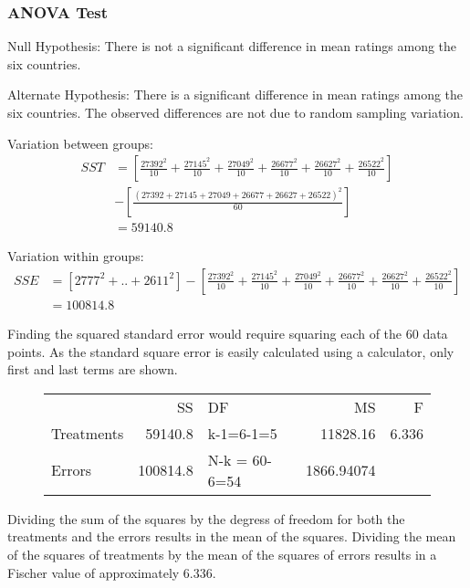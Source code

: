 \documentclass[12pt, titlepage]{article}
\begin{document}
\subsubsection{ANOVA Test}
Null Hypothesis: There is not a significant difference in mean ratings among the six countries. 

Alternate Hypothesis: There is a significant difference in mean ratings among the six countries. The observed differences are not due to random sampling variation.

Variation between groups:
\begin{equation*}
\begin{split}
    SST & = [\frac{27392^{2}}{10} + \frac{27145^{2}}{10} + \frac{27049^{2}}{10} + \frac{26677^{2}}{10} + \frac{26627^{2}}{10} + \frac{26522^{2}}{10}] \\ 
    & - [\frac{(27392+27145+27049+26677+26627+26522)^{2}}{60}] \\
    & = 59140.8 
\end{split}
\end{equation*}

Variation within groups:
\begin{equation*}
\begin{split}
    SSE & = [2777^{2} + .. + 2611^{2}] - [\frac{27392^{2}}{10} + \frac{27145^{2}}{10} + \frac{27049^{2}}{10} + \frac{26677^{2}}{10} + \frac{26627^{2}}{10} + \frac{26522^{2}}{10}] \\
    & = 100814.8 
\end{split}
\end{equation*}

Finding the squared standard error would require squaring each of the 60 data points. As the standard square error is easily calculated using a calculator, only first and last terms are shown.
\begin{figure}[H]
\centering
\begin{tabular}{lrlrr}
 & SS & DF & MS & F\\
Treatments & 59140.8 & k-1=6-1=5 & 11828.16 & 6.336\\
Errors & 100814.8 & N-k = 60-6=54 & 1866.94074 & \\
\end{tabular}
\end{figure}

Dividing the sum of the squares by the degress of freedom for both the treatments and the errors results in the mean of the squares. Dividing the mean of the squares of treatments by the mean of the squares of errors results in a Fischer value of approximately 6.336.
\end{document}
